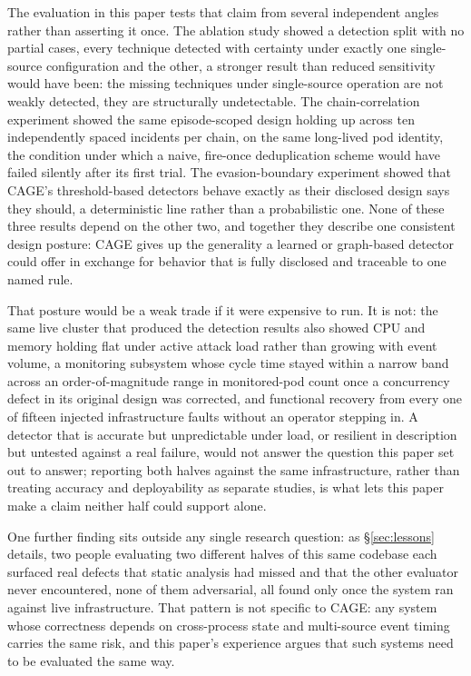 \documentclass{ieeeaccess}
\begin{document}
The evaluation in this paper tests that claim from several independent
angles rather than asserting it once. The ablation study showed a
detection split with no partial cases, every technique detected with
certainty under exactly one single-source configuration and the other,
a stronger result than reduced sensitivity would have been: the
missing techniques under single-source operation are not weakly
detected, they are structurally undetectable. The chain-correlation
experiment showed the same episode-scoped design holding up across ten
independently spaced incidents per chain, on the same long-lived pod
identity, the condition under which a naive, fire-once deduplication
scheme would have failed silently after its first trial. The
evasion-boundary experiment showed that CAGE's threshold-based
detectors behave exactly as their disclosed design says they should, a
deterministic line rather than a probabilistic one. None of these
three results depend on the other two, and together they describe one
consistent design posture: CAGE gives up the generality a learned or
graph-based detector could offer in exchange for behavior that is
fully disclosed and traceable to one named rule.

That posture would be a weak trade if it were expensive to run. It is
not: the same live cluster that produced the detection results also
showed CPU and memory holding flat under active attack load rather
than growing with event volume, a monitoring subsystem whose cycle
time stayed within a narrow band across an order-of-magnitude range in
monitored-pod count once a concurrency defect in its original design
was corrected, and functional recovery from every one of fifteen
injected infrastructure faults without an operator stepping in. A
detector that is accurate but unpredictable under load, or resilient
in description but untested against a real failure, would not answer
the question this paper set out to answer; reporting both halves
against the same infrastructure, rather than treating accuracy and
deployability as separate studies, is what lets this paper make a
claim neither half could support alone.

One further finding sits outside any single research question: as
\S\ref{sec:lessons} details, two people evaluating two different halves
of this same codebase each surfaced real defects that static analysis
had missed and that the other evaluator never encountered, none of
them adversarial, all found only once the system ran against live
infrastructure. That pattern is not specific to CAGE: any system whose
correctness depends on cross-process state and multi-source event
timing carries the same risk, and this paper's experience argues that
such systems need to be evaluated the same way.
\end{document}
